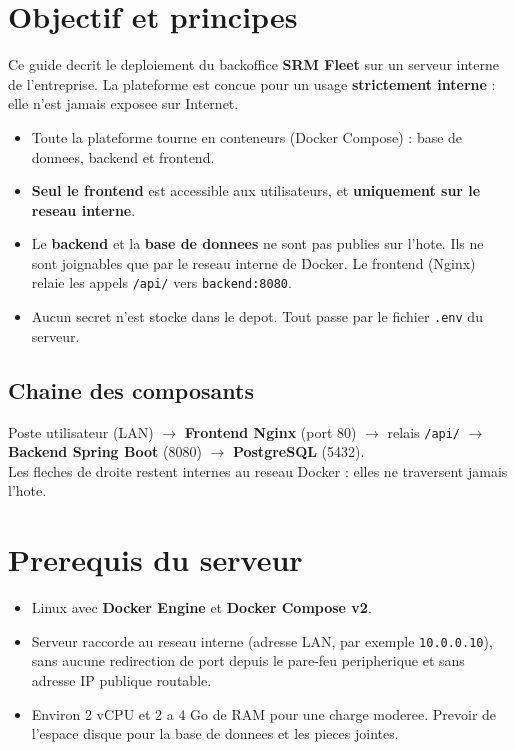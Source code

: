 \documentclass[11pt]{article}
\begin{document}

\tableofcontents
\vspace{0.6cm}
\srmrule
\vspace{0.4cm}

\section{Objectif et principes}
Ce guide decrit le deploiement du backoffice \textbf{SRM Fleet} sur un serveur interne de
l'entreprise. La plateforme est concue pour un usage \textbf{strictement interne} : elle n'est
jamais exposee sur Internet.

\begin{itemize}
  \item Toute la plateforme tourne en conteneurs (Docker Compose) : base de donnees, backend et frontend.
  \item \textbf{Seul le frontend} est accessible aux utilisateurs, et \textbf{uniquement sur le reseau interne}.
  \item Le \textbf{backend} et la \textbf{base de donnees} ne sont pas publies sur l'hote. Ils ne sont
        joignables que par le reseau interne de Docker. Le frontend (Nginx) relaie les appels
        \texttt{/api/} vers \texttt{backend:8080}.
  \item Aucun secret n'est stocke dans le depot. Tout passe par le fichier \texttt{.env} du serveur.
\end{itemize}

\subsection{Chaine des composants}
\begin{srmnote}
Poste utilisateur (LAN) \;$\rightarrow$\; \textbf{Frontend Nginx} (port 80) \;$\rightarrow$\; relais \texttt{/api/}
\;$\rightarrow$\; \textbf{Backend Spring Boot} (8080) \;$\rightarrow$\; \textbf{PostgreSQL} (5432).\\
Les fleches de droite restent internes au reseau Docker : elles ne traversent jamais l'hote.
\end{srmnote}

\section{Prerequis du serveur}
\begin{itemize}
  \item Linux avec \textbf{Docker Engine} et \textbf{Docker Compose v2}.
  \item Serveur raccorde au reseau interne (adresse LAN, par exemple \texttt{10.0.0.10}), sans aucune
        redirection de port depuis le pare-feu peripherique et sans adresse IP publique routable.
  \item Environ 2 vCPU et 2 a 4 Go de RAM pour une charge moderee. Prevoir de l'espace disque pour la
        base de donnees et les pieces jointes.
\end{itemize}
\end{document}

